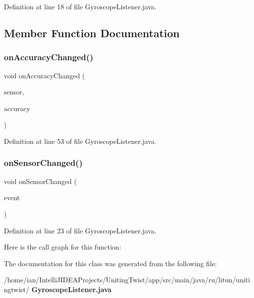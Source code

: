Definition at line 18 of file Gyroscope\+Listener.\+java.



\subsection{Member Function Documentation}
\mbox{\label{classru_1_1litun_1_1unitingtwist_1_1_gyroscope_listener_ad4112c2f627aebbbde6f254a743597d7}} 
\subsubsection{on\+Accuracy\+Changed()}
{\footnotesize\ttfamily void on\+Accuracy\+Changed (\begin{DoxyParamCaption}\item[{Sensor}]{sensor,  }\item[{int}]{accuracy }\end{DoxyParamCaption})}



Definition at line 53 of file Gyroscope\+Listener.\+java.

\mbox{\label{classru_1_1litun_1_1unitingtwist_1_1_gyroscope_listener_af9fd31ff49a1d915a5c85cd04d87d30b}} 
\subsubsection{on\+Sensor\+Changed()}
{\footnotesize\ttfamily void on\+Sensor\+Changed (\begin{DoxyParamCaption}\item[{Sensor\+Event}]{event }\end{DoxyParamCaption})}



Definition at line 23 of file Gyroscope\+Listener.\+java.

Here is the call graph for this function\+:


The documentation for this class was generated from the following file\+:\begin{DoxyCompactItemize}
\item 
/home/ian/\+Intelli\+J\+I\+D\+E\+A\+Projects/\+Uniting\+Twist/app/src/main/java/ru/litun/unitingtwist/\textbf{ Gyroscope\+Listener.\+java}\end{DoxyCompactItemize}
